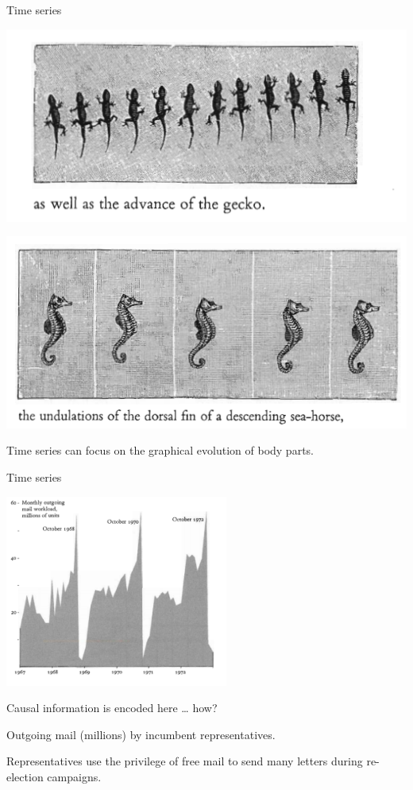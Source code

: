 \documentclass[
  ignorenonframetext,
]{beamer}
\begin{document}
\begin{frame}{Time series}
\label{time-series-5}
\centering
\begin{minipage}{0.55\textwidth}
\centering
\includegraphics[width=\textwidth]{excellence_figs/fig_19.png}
\end{minipage}
\hfill
\begin{minipage}{0.55\textwidth}
\centering
\includegraphics[width=\textwidth]{excellence_figs/fig_18.png}
\end{minipage}

Time series can focus on the graphical evolution of body parts.
\end{frame}

\begin{frame}{Time series}
\label{time-series-6}
\begin{center}
\includegraphics[width=0.55\textwidth]{excellence_figs/fig_20.png}
\end{center}

\footnotesize

Causal information is encoded here \ldots{} how?

Outgoing mail (millions) by incumbent representatives.

Representatives use the privilege of free mail to send many letters
during re-election campaigns.
\end{frame}
\end{document}
